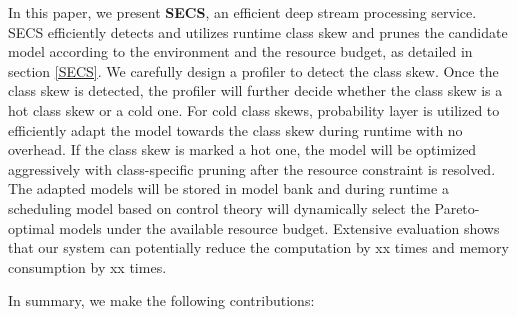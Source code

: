 \documentclass[pageno]{jpaper}
\begin{document}

In this paper, we present \textbf{SECS}, an efficient deep stream processing service. SECS efficiently detects and utilizes runtime class skew and prunes the candidate model according to the environment and the resource budget, as detailed in section \ref{SECS}. We carefully design a profiler to detect the class skew. Once the class skew is detected, the profiler will further decide whether the class skew is a hot class skew or a cold one. For cold class skews, probability layer is utilized to efficiently adapt the model towards the class skew during runtime with no overhead. If the class skew is marked a hot one, the model will be optimized aggressively with class-specific pruning after the resource constraint is resolved. The adapted models will be stored in model bank and during runtime a scheduling model based on control theory will dynamically select the Pareto-optimal models under the available resource budget. Extensive evaluation shows that our system can potentially reduce the computation by xx times and memory consumption by xx times.

In summary, we make the following contributions:
\end{document}
